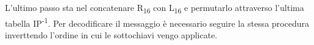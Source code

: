 \documentclass{article}
\begin{document}
				\paragraph{} 
				L'ultimo passo sta nel concatenare R\textsubscript{16} con L\textsubscript{16} e permutarlo attraverso l'ultima tabella IP\textsuperscript{-1}. Per decodificare il messaggio è necessario seguire la stessa procedura inverttendo l'ordine in cui le sottochiavi vengo applicate.
\end{document}
